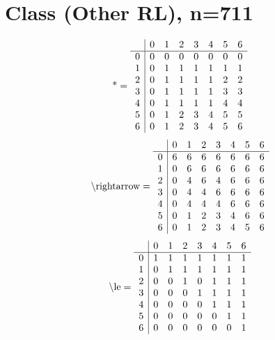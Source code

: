 \documentclass[11pt]{article}
\begin{document}
\section{Class (Other RL), n=711}
\[\text{*} = 
\begin{array}{r | r r r r r r r}
 & 0 & 1 & 2 & 3 & 4 & 5 & 6 \\ \hline
0 & 0 & 0 & 0 & 0 & 0 & 0 & 0 \\
1 & 0 & 1 & 1 & 1 & 1 & 1 & 1 \\
2 & 0 & 1 & 1 & 1 & 1 & 2 & 2 \\
3 & 0 & 1 & 1 & 1 & 1 & 3 & 3 \\
4 & 0 & 1 & 1 & 1 & 1 & 4 & 4 \\
5 & 0 & 1 & 2 & 3 & 4 & 5 & 5 \\
6 & 0 & 1 & 2 & 3 & 4 & 5 & 6 \\
\end{array}
\]
\[\text{\textbackslash rightarrow} = 
\begin{array}{r | r r r r r r r}
 & 0 & 1 & 2 & 3 & 4 & 5 & 6 \\ \hline
0 & 6 & 6 & 6 & 6 & 6 & 6 & 6 \\
1 & 0 & 6 & 6 & 6 & 6 & 6 & 6 \\
2 & 0 & 4 & 6 & 4 & 6 & 6 & 6 \\
3 & 0 & 4 & 4 & 6 & 6 & 6 & 6 \\
4 & 0 & 4 & 4 & 4 & 6 & 6 & 6 \\
5 & 0 & 1 & 2 & 3 & 4 & 6 & 6 \\
6 & 0 & 1 & 2 & 3 & 4 & 5 & 6 \\
\end{array}
\]
\[\text{\textbackslash le} = 
\begin{array}{r | r r r r r r r}
 & 0 & 1 & 2 & 3 & 4 & 5 & 6 \\ \hline
0 & 1 & 1 & 1 & 1 & 1 & 1 & 1 \\
1 & 0 & 1 & 1 & 1 & 1 & 1 & 1 \\
2 & 0 & 0 & 1 & 0 & 1 & 1 & 1 \\
3 & 0 & 0 & 0 & 1 & 1 & 1 & 1 \\
4 & 0 & 0 & 0 & 0 & 1 & 1 & 1 \\
5 & 0 & 0 & 0 & 0 & 0 & 1 & 1 \\
6 & 0 & 0 & 0 & 0 & 0 & 0 & 1 \\
\end{array}
\]
\end{document}
